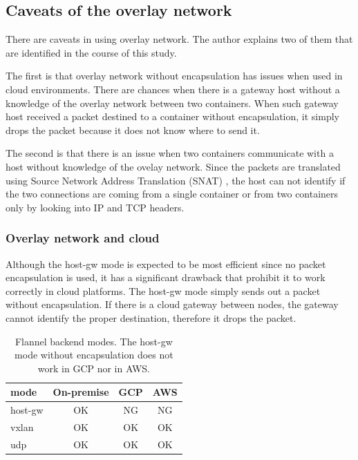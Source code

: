 \FloatBarrier

\subsection{Caveats of the overlay network}

There are caveats in using overlay network.
The author explains two of them that are identified in the course of this study.


  The first is that overlay network without encapsulation has issues when used in cloud environments.
  There are chances when there is a gateway host without a knowledge of the overlay network between two containers.
  When such gateway host received a packet destined to a container without encapsulation, it simply drops the packet because it does not know where to send it.



  The second is that there is an issue when two containers communicate with a host without knowledge of the ovelay network.
  Since the packets are translated using Source Network Address Translation (SNAT) \cite{MartinA.Brown2017}, the host can not identify if the two connections are coming from a single container or from two containers only by looking into IP and TCP headers.


\subsubsection{Overlay network and cloud}

Although the host-gw mode is expected to be most efficient since no packet encapsulation is used, it has a significant drawback that prohibit it to work correctly in cloud platforms. 
The host-gw mode simply sends out a packet without encapsulation.
If there is a cloud gateway between nodes, the gateway cannot identify the proper destination, therefore it drops the packet.

\begin{table}
  \centering
  \begin{tabular}{lccc}
    \toprule
    mode & On-premise & GCP & AWS \\
    \midrule
    host-gw & OK & NG & NG \\
    vxlan & OK & OK & OK \\
    udp & OK & OK & OK \\
    \bottomrule
  \end{tabular}

  \par\bigskip
  \centering
  \begin{minipage}{0.9\columnwidth}
    \caption[Flannel backend modes]{
      Flannel backend modes.
      The host-gw mode without encapsulation does not work in GCP nor in AWS.
    }
    \label{tab:Viable flannel backends}
  \end{minipage}
\end{table}

